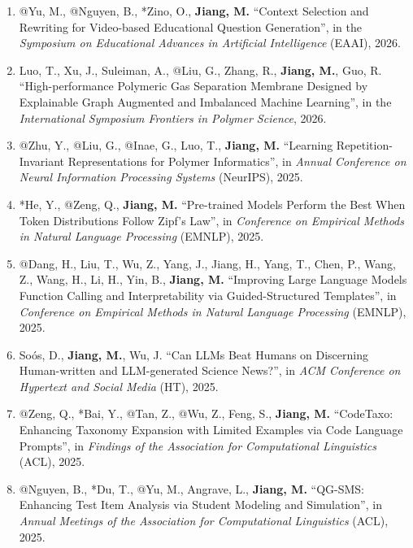 \documentclass[10pt]{article}
\newenvironment{myindentpar}[1]%
{\begin{list}{}%
         {\setlength{\leftmargin}{#1}}%
         \item[]%
}
{\end{list}}
\newcounter{list}
\begin{document}
\begin{myindentpar}{0.00cm}
\begin{enumerate}[leftmargin=.5cm]
\item[C125] @Yu, M., @Nguyen, B., *Zino, O., \textbf{Jiang, M.} ``Context Selection and Rewriting for Video-based Educational Question Generation'', in the \textit{Symposium on Educational Advances in Artificial Intelligence} (EAAI), 2026.

\item[C124] Luo, T., Xu, J., Suleiman, A., @Liu, G., Zhang, R., \textbf{Jiang, M.}, Guo, R. ``High-performance Polymeric Gas Separation Membrane Designed by Explainable Graph Augmented and Imbalanced Machine Learning'', in the \textit{International Symposium Frontiers in Polymer Science}, 2026.
		
\item[C123] @Zhu, Y., @Liu, G., @Inae, G., Luo, T., \textbf{Jiang, M.} ``Learning Repetition-Invariant Representations for Polymer Informatics'', in \textit{Annual Conference on Neural Information Processing Systems} (NeurIPS), 2025.

\item[C122] *He, Y., @Zeng, Q., \textbf{Jiang, M.} ``Pre-trained Models Perform the Best When Token Distributions Follow Zipf’s Law'', in \textit{Conference on Empirical Methods in Natural Language Processing} (EMNLP), 2025.

\item[C121] @Dang, H., Liu, T., Wu, Z., Yang, J., Jiang, H., Yang, T., Chen, P., Wang, Z., Wang, H., Li, H., Yin, B., \textbf{Jiang, M.} ``Improving Large Language Models Function Calling and Interpretability via Guided-Structured Templates'', in \textit{Conference on Empirical Methods in Natural Language Processing} (EMNLP), 2025.

\item[C120] Soós, D., \textbf{Jiang, M.}, Wu, J. ``Can LLMs Beat Humans on Discerning Human-written and LLM-generated Science News?'', in \textit{ACM Conference on Hypertext and Social Media} (HT), 2025.

\item[C119] @Zeng, Q., *Bai, Y., @Tan, Z., @Wu, Z., Feng, S., \textbf{Jiang, M.} ``CodeTaxo: Enhancing Taxonomy Expansion with Limited Examples via Code Language Prompts'', in \textit{Findings of the Association for Computational Linguistics} (ACL), 2025.

\item[C118] @Nguyen, B., *Du, T., @Yu, M., Angrave, L., \textbf{Jiang, M.} ``QG-SMS: Enhancing Test Item Analysis via Student Modeling and Simulation'', in \textit{Annual Meetings of the Association for Computational Linguistics} (ACL), 2025.


\end{enumerate}
\end{myindentpar}
\end{document}
